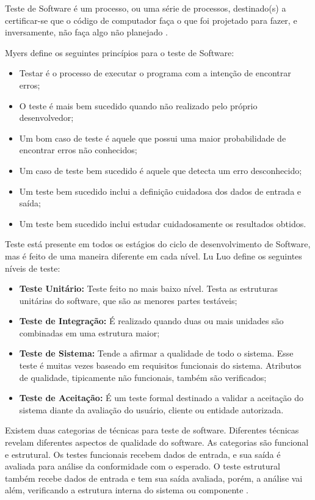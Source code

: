 Teste de Software é um processo, ou uma série de processos, destinado(s) a
certificar-se que o código de computador faça o que foi projetado para fazer,
e inversamente, não faça algo não planejado \cite{myers2011}.

Myers \cite{myers2011} define os seguintes princípios para o teste de Software:

\begin{itemize}
  \item Testar é o processo de executar o programa com a intenção de encontrar erros;
  \item O teste é mais bem sucedido quando não realizado pelo próprio desenvolvedor;
  \item Um bom caso de teste é aquele que possui uma maior probabilidade de encontrar erros não conhecidos;
  \item Um caso de teste bem sucedido é aquele que detecta um erro desconhecido;
  \item Um teste bem sucedido inclui a definição cuidadosa dos dados de entrada e saída;
  \item Um teste bem sucedido inclui estudar cuidadosamente os resultados obtidos.
\end{itemize}

Teste está presente em todos os estágios do ciclo de desenvolvimento de
Software, mas é feito de uma maneira diferente em cada nível. Lu Luo
\cite{luo2001} define os seguintes níveis de teste:

\begin{itemize}
  \item \textbf{Teste Unitário:} Teste feito no mais baixo nível. Testa as estruturas unitárias do software, que são as menores partes testáveis;
  \item \textbf{Teste de Integração:} É realizado quando duas ou mais unidades são combinadas em uma estrutura maior;
  \item \textbf{Teste de Sistema:} Tende a afirmar a qualidade de todo o sistema. Esse teste é muitas vezes baseado em requisitos funcionais do sistema. Atributos de qualidade, tipicamente não funcionais, também são verificados;
  \item \textbf{Teste de Aceitação:} É um teste formal destinado a validar a aceitação do sistema diante da avaliação do usuário, cliente ou entidade autorizada.
\end{itemize}

Existem duas categorias de técnicas para teste de software. Diferentes
técnicas revelam diferentes aspectos de qualidade do software. As categorias
são funcional e estrutural. Os testes funcionais recebem dados de entrada, e
sua saída é avaliada para análise da conformidade com o esperado. O teste
estrutural também recebe dados de entrada e tem sua saída avaliada, porém, a
análise vai além, verificando a estrutura interna do sistema ou componente
\cite{luo2001}.

